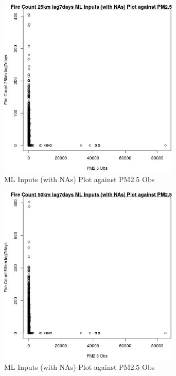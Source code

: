 \begin{figure} 
\centering  
\includegraphics[width=0.77\textwidth]{Code_Outputs/Report_ML_input_PM25_Step4_part_f_de_duplicated_aveswNAs_Fire_Count_25km_lag7daysvPM25_Obs.jpg} 
\caption{\label{fig:Report_ML_input_PM25_Step4_part_f_de_duplicated_aveswNAsFire_Count_25km_lag7daysvPM25_Obs}ML Inputs (with NAs) Plot against PM2.5 Obs} 
\end{figure} 
 

\clearpage 

\begin{figure} 
\centering  
\includegraphics[width=0.77\textwidth]{Code_Outputs/Report_ML_input_PM25_Step4_part_f_de_duplicated_aveswNAs_Fire_Count_50km_lag7daysvPM25_Obs.jpg} 
\caption{\label{fig:Report_ML_input_PM25_Step4_part_f_de_duplicated_aveswNAsFire_Count_50km_lag7daysvPM25_Obs}ML Inputs (with NAs) Plot against PM2.5 Obs} 
\end{figure} 
 

